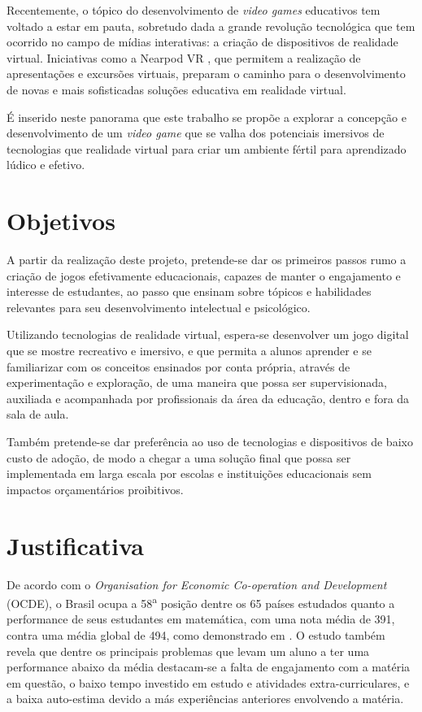Recentemente, o tópico do desenvolvimento de \textit{video games} educativos tem voltado a estar em pauta, sobretudo dada a grande revolução tecnológica que tem ocorrido no campo de mídias interativas: a criação de dispositivos de realidade virtual. Iniciativas como a Nearpod VR \cite{nearpod}, que permitem a realização de apresentações e excursões virtuais, preparam o caminho para o desenvolvimento de novas e mais sofisticadas soluções educativa em realidade virtual.

É inserido neste panorama que este trabalho se propõe a explorar a concepção e desenvolvimento de um \textit{video game} que se valha dos potenciais imersivos de tecnologias que realidade virtual para criar um ambiente fértil para aprendizado lúdico e efetivo.


\section{Objetivos}\label{sec-objetivos}

A partir da realização deste projeto, pretende-se dar os primeiros passos rumo a criação de jogos efetivamente educacionais, capazes de manter o engajamento e interesse de estudantes, ao passo que ensinam sobre tópicos e habilidades relevantes para seu desenvolvimento intelectual e psicológico.

Utilizando tecnologias de realidade virtual, espera-se desenvolver um jogo digital que se mostre recreativo e imersivo, e que permita a alunos aprender e se familiarizar com os conceitos ensinados por conta própria, através de experimentação e exploração, de uma maneira que possa ser supervisionada, auxiliada e acompanhada por profissionais da área da educação, dentro e fora da sala de aula.

Também pretende-se dar preferência ao uso de tecnologias e dispositivos de baixo custo de adoção, de modo a chegar a uma solução final  que possa ser implementada em larga escala por escolas e instituições educacionais sem impactos orçamentários proibitivos.


\section{Justificativa}\label{sec-justificativas}

De acordo com o \textit{Organisation for Economic Co-operation and Development} (OCDE), o Brasil ocupa a 58\textsuperscript{a} posição dentre os 65 países estudados quanto a performance de seus estudantes em matemática, com uma nota média de 391, contra uma média global de 494, como demonstrado em \cite{OECD:2016:low_performing_students}. 
O estudo também revela que dentre os principais problemas que levam um aluno a ter uma performance abaixo da média destacam-se a falta de engajamento com a matéria em questão, o baixo tempo investido em estudo e atividades extra-curriculares, e a baixa auto-estima devido a más experiências anteriores envolvendo a matéria.

